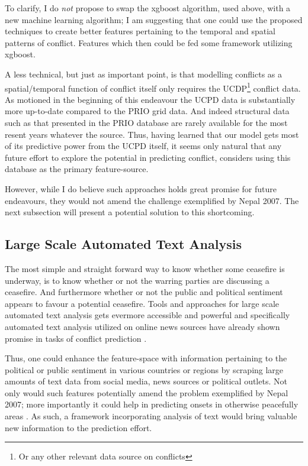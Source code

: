 \documentclass[a4paper]{article}
\begin{document}
To clarify, I do \emph{not} propose to swap the xgboost algorithm, used above, with a new machine learning algorithm; I am suggesting that one could use the proposed techniques to create better features pertaining to the temporal and spatial patterns of conflict. Features which then could be fed some framework utilizing xgboost.\par

A less technical, but just as important point, is that modelling conflicts as a spatial/temporal function of conflict itself only requires the UCDP\footnote{Or any other relevant data source on conflicts} conflict data. As motioned in the beginning of this endeavour the UCPD data is substantially more up-to-date compared to the PRIO grid data. And indeed structural data such as that presented in the PRIO database are rarely available for the most resent years whatever the source. Thus, having learned that our model gets most of its predictive power from the UCPD itself, it seems only natural that any future effort to explore the potential in predicting conflict, considers using this database as the primary feature-source.\par

However, while I do believe such approaches holds great promise for future endeavours, they would not amend the challenge exemplified by Nepal 2007. The next subsection will present a potential solution to this shortcoming.\par

\subsection{Large Scale Automated Text Analysis}

The most simple and straight forward way to know whether some ceasefire is underway, is to know whether or not the warring parties are discussing a ceasefire. And furthermore whether or not the public and political sentiment appears to favour a potential ceasefire. Tools and approaches for large scale automated text analysis gets evermore accessible and powerful and specifically automated text analysis utilized on online news sources have already shown promise in tasks of conflict prediction \citep{chadefaux_2014, mueller_2016}. 

Thus, one could enhance the feature-space with information pertaining to the political or public sentiment in various countries or regions by scraping large amounts of text data from social media, news sources or political outlets. Not only would such features potentially amend the problem exemplified by Nepal 2007; more importantly it could help in predicting onsets in otherwise peacefully areas \citep{mueller_2016}. As such, a framework incorporating analysis of text would bring valuable new information to the prediction effort.\par
\end{document}
